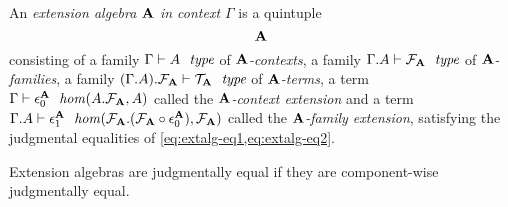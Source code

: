 \begin{defn}\label{defn:extension-algebras}
An \emph{extension algebra $\mathbf{A}$ in context $\Gamma$} is a quintuple
\begin{equation*}
\unfold{\extalg{A}}
\end{equation*}
consisting of a family $\jextalgctx{\Gamma}{A}$ of \emph{$\mathbf{A}$-contexts}, 
a family $\jextalgfam{\Gamma}{A}$ of \emph{$\mathbf{A}$-families}, a family 
$\jextalgtm{\Gamma}{A}$ of \emph{$\mathbf{A}$-terms}, a term
$\jextalgctxext{\Gamma}{A}$ called the \emph{$\mathbf{A}$-context extension}
and a term $\jextalgfamext{\Gamma}{A}$ called the \emph{$\mathbf{A}$-family
extension}, satisfying the judgmental equalities of
\autoref{eq:extalg-eq1,eq:extalg-eq2}.
\begin{comment}
We define the judgment
\begin{equation*}
\jextalg{\Gamma}{A}
\end{equation*}
asserting that $\extalg{A}$ is an \emph{extension algebra in context $\Gamma$}
to be the conjunction of the following seven judgments:
\begin{align*}
\jalign\jextalgctx{\Gamma}{A}
  \\
\jalign\jextalgfam{\Gamma}{A}
  \\
\jalign\jextalgtm{\Gamma}{A}
  \\
\jalign\jextalgctxext{\Gamma}{A}
  \\
\jalign\jextalgfamext{\Gamma}{A}
  \\
\jalign\jhomeq
  { \Gamma}
  { {\cftalgc{\cftalg{A}}}
    { {\cftalgf{\cftalg{A}}}
      {\jcomp{}{\cftctxext[\cftalg{A}]}{\cftalgf{\cftalg{A}}}}
      }
    }
  { \cftalgc{\cftalg{A}}}
  { \jcomp{}
      { \jvcomp{}
          {\cftctxext[\cftalg{A}]}
          {\idtm{\jcomp{}{\cftctxext[\cftalg{A}]}{\cftalgf{\cftalg{A}}}}}
        }
      { \cftctxext[\cftalg{A}]}
    }
  { \jcomp{}
      { \jvcomp{}
          {\idtm{\cftalgc{\cftalg{A}}}}
          {\cftfamext[\cftalg{A}]}
        }
      { \cftctxext[\cftalg{A}]}
    }
  \\
\jalign\jhomeq
  { {\Gamma}{\cftalgc{\cftalg{A}}}}
  { { \cftalgf{\cftalg{A}}}
    { { \jcomp{}{\cftctxext[\cftalg{A}]}{\cftalgf{\cftalg{A}}}}
      { \jcomp{}
          {\cftctxext[\cftalg{A}]}
          {{}{\cftctxext[\cftalg{A}]}{\cftalgf{\cftalg{A}}}}
        }
      }
    }
  { \cftalgf{\cftalg{A}}}
  { \jcomp{}
      { \cftfamext[\cftalg{A}]}
      { \jvcomp{}
          {\cftfamext[\cftalg{A}]}
          {\idtm{\jcomp{}{\cftfamext[\cftalg{A}]}{{}{\cftctxext[\cftalg{A}]}{\cftalgf{\cftalg{A}}}}}}}
    }
  { \jcomp{}
      { \cftfamext[\cftalg{A}]}
      { \jvcomp{}
          {\idtm{\cftalgf{\cftalg{A}}}}
          {\jcomp{}{\cftctxext[\cftalg{A}]}{\cftfamext[\cftalg{A}]}}
        }
    }
\end{align*}
In other words, an extension algebra $\extalg{A}$ in context $\Gamma$
is a quintuple $\unfold{\extalg{A}}$ 
satisfying the judgmental equalities displayed in the diagrams in
\autoref{eq:extalg-eq1,eq:extalg-eq2}.
\end{comment}
Extension algebras are judgmentally
equal if they are component-wise judgmentally equal.


\end{defn}
